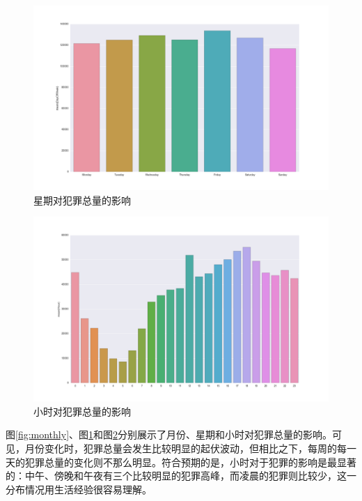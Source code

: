 \begin{figure}[tb]
    \centering
    \includegraphics[width=1.0\linewidth]{fig/DayOfWeek}
    \caption{星期对犯罪总量的影响}
    \label{fig:dayofweek}
\end{figure}

\begin{figure}[tb]
    \centering
    \includegraphics[width=1.0\linewidth]{fig/Hourly}
    \caption{小时对犯罪总量的影响}
    \label{fig:hourly}
\end{figure}

图\ref{fig:monthly}、图\ref{fig:dayofweek}和图\ref{fig:hourly}分别展示了月份、星期和小时对犯罪总量的影响。可见，月份变化时，犯罪总量会发生比较明显的起伏波动，但相比之下，每周的每一天的犯罪总量的变化则不那么明显。符合预期的是，小时对于犯罪的影响是最显著的：中午、傍晚和午夜有三个比较明显的犯罪高峰，而凌晨的犯罪则比较少，这一分布情况用生活经验很容易理解。

